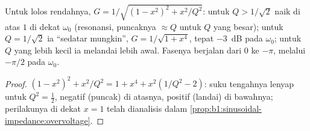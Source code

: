 \begin{proposition}\label{prop:b1:filters-transfer-functions:lowpass2}
Untuk lolos rendahnya, $G = 1/\sqrt{(1 - x^2)^2 + x^2/Q^2}$: untuk
$Q > 1/\sqrt2$  naik di atas $1$ di dekat $\omega_0$
(resonansi, puncaknya $\approx Q$ untuk $Q$ yang besar); untuk
$Q = 1/\sqrt2$ ia ``sedatar mungkin'', $G = 1/\sqrt{1 + x^4}$, tepat
\qty{-3}{dB} pada $\omega_0$; untuk $Q$ yang lebih kecil ia melandai
lebih awal. Fasenya berjalan dari $0$ ke $-\pi$, melalui $-\pi/2$ pada $\omega_0$.
\end{proposition}

\begin{proof}
$(1 - x^2)^2 + x^2/Q^2 = 1 + x^4 + x^2(1/Q^2 - 2)$: suku tengahnya
lenyap untuk $Q^2 = \tfrac12$, negatif (puncak) di atasnya, positif
(landai) di bawahnya; perilakunya di dekat $x = 1$ telah dianalisis
dalam \cref{prop:b1:sinusoidal-impedance:overvoltage}.
\end{proof}

